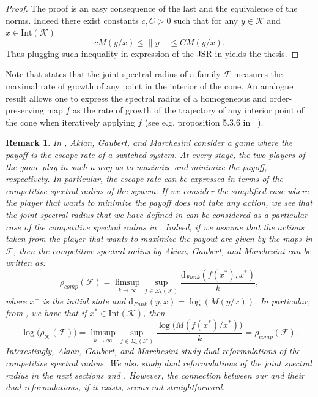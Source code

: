 \documentclass{article}
\newtheorem{remark}[theorem]{Remark}
\newcommand{\family}{\mathcal{F}}
\newcommand{\cradius}{\rho_{\cone}}
\newcommand{\cone}{\mathcal{K}}
\newcommand{\interior}{\mathrm{Int}}
\begin{document}
\begin{proof}
    The proof is an easy consequence of the last  and the equivalence of the norms. Indeed there exist constants $c,C>0$ such that for any $y\in \cone$ and $x\in\interior(\cone)$ 
    $$cM(y/x) \leq\|y\|\leq  C M(y/x).$$
    Thus plugging such inequality in expression of the JSR in  yields the thesis.
\end{proof}
%
Note that  states that the joint spectral radius of a family $\family$ measures the maximal rate of growth of any point in the interior of the cone. An analogue result allows one to express the spectral radius of a homogeneous and order-preserving map $f$ as the rate of growth of the trajectory of any interior point of the cone when iteratively applying $f$ (see e.g. proposition 5.3.6 in \ \cite{lemmens2012nonlinear}). 


\begin{remark}\label{reamrk_competitive_spectral_radius}
In \cite{akian2024competive}, Akian, Gaubert, and Marchesini consider a game where the payoff is the escape rate of a switched system. At every stage, the two players of the game play in such a way as to maximize and minimize the payoff, respectively. In particular, the escape rate can be expressed in terms of the competitive spectral radius of the system. If we consider the simplified case where the player that wants to minimize the payoff does not take any action, we see that the joint spectral radius that we have defined in  can be considered as a particular case of the competitive spectral radius in \cite{akian2024competive}. Indeed, if we assume that the actions taken from the player that wants to maximize the payout are given by the maps in $\family$, then the competitive spectral radius by Akian, Gaubert, and Marchesini can be written as:  
\begin{equation}
    \rho_{comp}(\family)=\limsup_{k\rightarrow \infty} \sup_{f\in \Sigma_k(\family)}\frac{\mathrm{d}_{Funk}(f(x^*),x^*)}{k},
\end{equation}
where $x^+$ is the initial state and $\mathrm{d}_{Funk}(y,x)=\log (M(y/x))$. In particular, from , we have that if $x^*\in \interior(\cone)$, then
\begin{equation}
    \log\big(\cradius(\family)\big)=\limsup_{k\rightarrow\infty} \sup_{f\in \Sigma_k(\family)}\frac{\log\big(M(f(x^*)/x^*)\big)}{k}=\rho_{comp}(\family).
\end{equation}
Interestingly, Akian, Gaubert, and Marchesini study dual reformulations of the competitive spectral radius. We also study dual reformulations of the joint spectral radius in the next sections  and . However, the connection between our and their dual reformulations, if it exists, seems not straightforward.
\end{remark}
\end{document}

